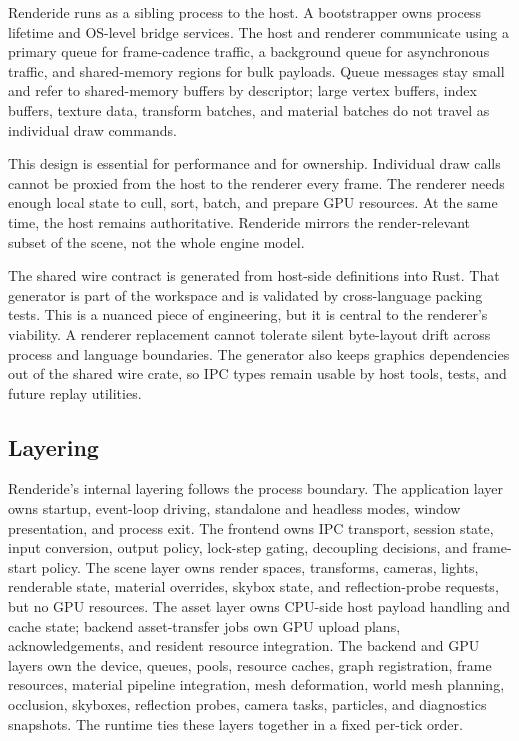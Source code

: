\documentclass[acmtog,screen,nonacm]{acmart}
\begin{document}
Renderide runs as a sibling process to the host. A bootstrapper owns process lifetime and OS-level bridge services. The host and renderer communicate using a primary queue for frame-cadence traffic, a background queue for asynchronous traffic, and shared-memory regions for bulk payloads. Queue messages stay small and refer to shared-memory buffers by descriptor; large vertex buffers, index buffers, texture data, transform batches, and material batches do not travel as individual draw commands.

This design is essential for performance and for ownership. Individual draw calls cannot be proxied from the host to the renderer every frame. The renderer needs enough local state to cull, sort, batch, and prepare GPU resources. At the same time, the host remains authoritative. Renderide mirrors the render-relevant subset of the scene, not the whole engine model.

The shared wire contract is generated from host-side definitions into Rust. That generator is part of the workspace and is validated by cross-language packing tests. This is a nuanced piece of engineering, but it is central to the renderer's viability. A renderer replacement cannot tolerate silent byte-layout drift across process and language boundaries. The generator also keeps graphics dependencies out of the shared wire crate, so IPC types remain usable by host tools, tests, and future replay utilities.

\subsection{Layering}

Renderide's internal layering follows the process boundary. The application layer owns startup, event-loop driving, standalone and headless modes, window presentation, and process exit. The frontend owns IPC transport, session state, input conversion, output policy, lock-step gating, decoupling decisions, and frame-start policy. The scene layer owns render spaces, transforms, cameras, lights, renderable state, material overrides, skybox state, and reflection-probe requests, but no GPU resources. The asset layer owns CPU-side host payload handling and cache state; backend asset-transfer jobs own GPU upload plans, acknowledgements, and resident resource integration. The backend and GPU layers own the device, queues, pools, resource caches, graph registration, frame resources, material pipeline integration, mesh deformation, world mesh planning, occlusion, skyboxes, reflection probes, camera tasks, particles, and diagnostics snapshots. The runtime ties these layers together in a fixed per-tick order.
\end{document}
